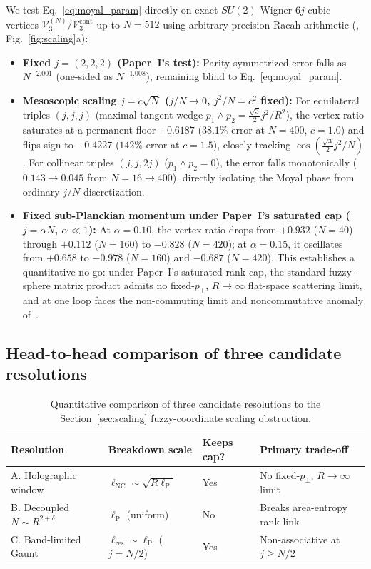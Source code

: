 \documentclass[11pt]{article}
\newcommand{\lP}{\ell_{\mathrm{P}}}
\newcommand{\calV}{\mathcal{V}}
\begin{document}
We test Eq.~\eqref{eq:moyal_param} directly on exact $SU(2)$ Wigner-$6j$ cubic vertices $\calV_3^{(N)}/\calV_3^{\mathrm{cont}}$ up to $N=512$ using arbitrary-precision Racah arithmetic (, Fig.~\ref{fig:scaling}a):
\begin{itemize}
\item \textbf{Fixed $j=(2,2,2)$ (Paper~I's test):} Parity-symmetrized error falls as $N^{-2.001}$ (one-sided as $N^{-1.008}$), remaining blind to Eq.~\eqref{eq:moyal_param}.
\item \textbf{Mesoscopic scaling $j = c\sqrt{N}$ ($j/N \to 0$, $j^2/N = c^2$ fixed):} For equilateral triples $(j,j,j)$ (maximal tangent wedge $p_1\wedge p_2 = \frac{\sqrt{3}}{2}j^2/R^2$), the vertex ratio saturates at a permanent floor $+0.6187$ ($38.1\%$ error at $N=400$, $c=1.0$) and flips sign to $-0.4227$ ($142\%$ error at $c=1.5$), closely tracking $\cos(\frac{\sqrt{3}}{2}j^2/N)$. For collinear triples $(j,j,2j)$ ($p_1\wedge p_2 = 0$), the error falls monotonically ($0.143 \to 0.045$ from $N=16 \to 400$), directly isolating the Moyal phase from ordinary $j/N$ discretization.
\item \textbf{Fixed sub-Planckian momentum under Paper~I's saturated cap ($j = \alpha N$, $\alpha \ll 1$):} At $\alpha = 0.10$, the vertex ratio drops from $+0.932$ ($N=40$) through $+0.112$ ($N=160$) to $-0.828$ ($N=420$); at $\alpha = 0.15$, it oscillates from $+0.658$ to $-0.978$ ($N=160$) and $-0.687$ ($N=420$). This establishes a quantitative no-go: under Paper~I's saturated rank cap, the standard fuzzy-sphere matrix product admits no fixed-$p_\perp$, $R\to\infty$ flat-space scattering limit, and at one loop faces the non-commuting limit and noncommutative anomaly of~\cite{ChuMadoreSteinacker2001}.
\end{itemize}

\subsection{Head-to-head comparison of three candidate resolutions}

\begin{table}[t]
\centering
\caption{Quantitative comparison of three candidate resolutions to the Section~\ref{sec:scaling} fuzzy-coordinate scaling obstruction.}
\label{tab:resolutions}
\footnotesize
\begin{tabular}{@{}p{}p{}p{}p{}@{}}
\toprule
Resolution & Breakdown scale & Keeps cap? & Primary trade-off \\
\midrule
A. Holographic window & $\ell_{\mathrm{NC}} \sim \sqrt{R\lP}$ & Yes & No fixed-$p_\perp$, $R\to\infty$ limit \\
B. Decoupled $N \sim R^{2+\delta}$ & $\lP$ (uniform) & No & Breaks area-entropy rank link \\
C. Band-limited Gaunt & $\ell_{\mathrm{res}} \sim \lP$ ($j = N/2$) & Yes & Non-associative at $j \ge N/2$ \\
\bottomrule
\end{tabular}
\end{table}
\end{document}
